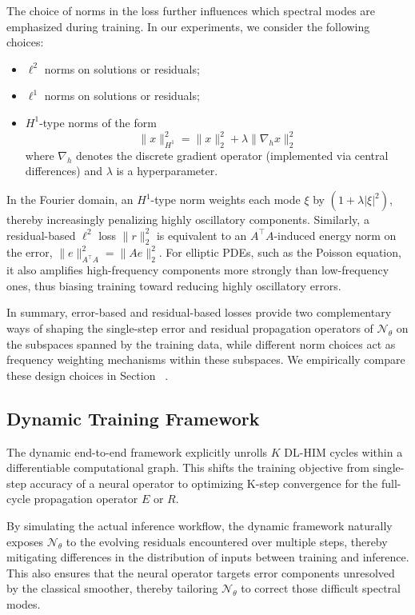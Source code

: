 \documentclass[11pt]{article}
\begin{document}
The choice of norms in the loss further influences which spectral modes are emphasized during training. In our experiments, we consider the following choices:
\begin{itemize}
    \item $\ell^2$ norms on solutions or residuals;
    \item $\ell^1$ norms on solutions or residuals;
    \item $H^1$-type norms of the form
          $$
              \|x\|_{H^1}^2 = \|x\|_2^2 + \lambda \|\nabla_h x\|_2^2
          $$
          where $\nabla_h$ denotes the discrete gradient operator (implemented via central differences) and $\lambda$ is a hyperparameter.
\end{itemize}

In the Fourier domain, an $H^1$-type norm weights each mode $\xi$ by $(1+\lambda |\xi|^2)$, thereby increasingly penalizing highly oscillatory components. Similarly, a residual-based $\ell^2$ loss $\|r\|^2_2$ is equivalent to an $A^\top A$-induced energy norm on the error, $\|e\|^2_{A^\top A} = \|Ae\|^2_2$. For elliptic PDEs, such as the Poisson equation, it also amplifies high-frequency components more strongly than low-frequency ones, thus biasing training toward reducing highly oscillatory errors.

In summary, error-based and residual-based losses provide two complementary ways of shaping the single-step error and residual propagation operators of $\mathcal N_\theta$ on the subspaces spanned by the training data, while different norm choices act as frequency weighting mechanisms within these subspaces. We empirically compare these design choices in Section~ .

\subsection{Dynamic Training Framework}\label{sec:dynamic_training}
The dynamic end-to-end framework explicitly unrolls $K$ DL-HIM cycles within a differentiable computational graph. This shifts the training objective from single-step accuracy of a neural operator to optimizing K-step convergence for the full-cycle propagation operator $E$ or $R$.

By simulating the actual inference workflow, the dynamic framework naturally exposes $\mathcal N_\theta$ to the evolving residuals encountered over multiple steps, thereby mitigating differences in the distribution of inputs between training and inference. This also ensures that the neural operator targets error components unresolved by the classical smoother, thereby tailoring $\mathcal N_\theta$ to correct those difficult spectral modes.
\end{document}
